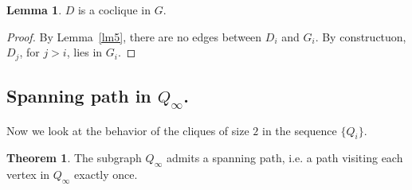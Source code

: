 \documentclass{amsart}
\theoremstyle{definition}
\newtheorem{theorem}{Theorem}
\newtheorem{lemma}{Lemma}
\begin{document}
\begin{lemma}\label{lmDcoclique}
$D$ is a coclique in $G$.
\end{lemma}
\begin{proof}
By Lemma~\ref{lm5}, there are no edges between $D_i$ and $G_i$. By constructuon, 
$D_j$, for $j>i$, lies in $G_i$.
\end{proof}

\subsection{Spanning path in $Q_{\infty}$.}
Now we look at the behavior of the cliques of size $2$ in the sequence $\{Q_i\}$.
\begin{theorem}\label{thm4}
The subgraph $Q_{\infty}$ admits a spanning path, i.e. a path visiting each vertex in $Q_{\infty}$ exactly once.
\end{theorem}
\end{document}
